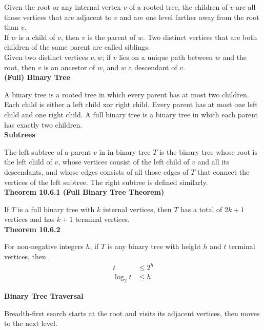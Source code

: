 \documentclass[a4paper]{article}
\newcommand{\subheading}[1]{{\scriptsize\textbf{#1}}}
\begin{document}
\begin{multicols*}{4}
Given the root or any internal vertex $v$ of a rooted tree, the children of $v$
are all those vertices that are adjacent to $v$ and are one level farther away
from the root than $v$.\\

If $w$ is a child of $v$, then $v$ is the parent of $w$. Two distinct vertices
that are both children of the same parent are called siblings.\\

Given two distinct vertices $v, w$; if $v$ lies on a unique path between $w$ and
the root, then $v$ is an ancestor of $w$, and $w$ a descendant of $v$.\\

\subheading{(Full) Binary Tree}

A binary tree is a rooted tree in which every parent has at most two children.
Each child is either a left child xor right child. Every parent has at most one
left child and one right child. A full binary tree is a binary tree in which
each parent has exactly two children.\\

\subheading{Subtrees}

The left subtree of a parent $v$ in in binary tree $T$ is the binary tree whose
root is the left child of $v$, whose vertices consist of the left child of $v$
and all its descendants, and whose edges consists of all those edges of $T$ that
connect the vertices of the left subtree. The right subtree is defined
similarly.\\

\subheading{Theorem 10.6.1 (Full Binary Tree Theorem)}

If $T$ is a full binary tree with $k$ internal vertices, then $T$ has a total of
$2k + 1$ vertices and has $k + 1$ terminal vertices.\\

\subheading{Theorem 10.6.2}

For non-negative integers $h$, if $T$ is any binary tree with height $h$ and $t$
terminal vertices, then
\begin{align*}
         t &\leq 2^h \\
  \log_2 t &\leq h
\end{align*}

\subheading{Binary Tree Traversal}

Breadth-first search starts at the root and visits its adjacent vertices, then
moves to the next level.\\


\end{multicols*}
\end{document}
